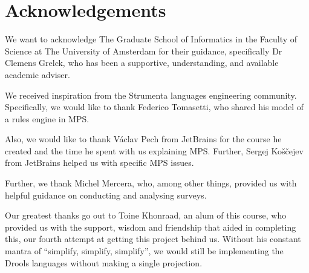 \chapter*{Acknowledgements}


We want to acknowledge The Graduate School of Informatics in the Faculty of Science at The University of Amsterdam for their guidance, specifically Dr Clemens Grelck, who has been a supportive, understanding, and available academic adviser.


We received inspiration from the Strumenta languages engineering community.
Specifically, we would like to thank Federico Tomasetti, who shared his model of a rules engine in MPS.


Also, we would like to thank Václav Pech from JetBrains for the course he created and the time he spent with us explaining MPS.
Further, Sergej Koščejev from JetBrains helped us with specific MPS issues.


Further, we thank Michel Mercera, who, among other things, provided us with helpful guidance on conducting and analysing surveys.


Our greatest thanks go out to Toine Khonraad, an alum of this course, who provided us with the support, wisdom and friendship that aided in completing this, our fourth attempt at getting this project behind us.
Without his constant mantra of ``simplify, simplify, simplify'', we would still be implementing the Drools languages without making a single projection.
